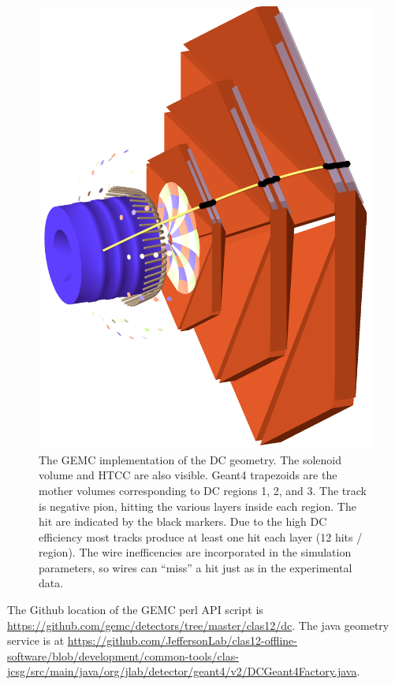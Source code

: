 \begin{figure}[h]
	\centering
	\includegraphics[width=0.99\columnwidth,keepaspectratio]{img/dcGeometry.png}
	\caption{The GEMC implementation of the DC geometry. The solenoid volume and HTCC are also visible.
             Geant4 trapezoids are the mother volumes corresponding to DC regions 1, 2, and 3. The track is negative pion,
			 hitting the various layers inside each region. The hit are indicated by the black markers. Due to the high DC
             efficiency most tracks produce at least one hit each layer (12 hits / region).
             The wire inefficencies are incorporated in the simulation parameters, so wires can ``miss'' a hit just as in the experimental data.}
	\label{fig:dcGeometry}
\end{figure}

The Github location of the GEMC perl API script is \url{https://github.com/gemc/detectors/tree/master/clas12/dc}.
The java geometry service is at
\url{https://github.com/JeffersonLab/clas12-offline-software/blob/development/common-tools/clas-jcsg/src/main/java/org/jlab/detector/geant4/v2/DCGeant4Factory.java}.

